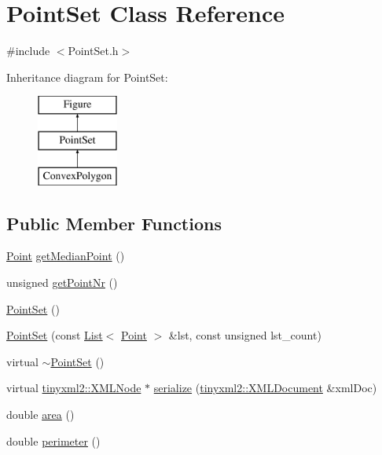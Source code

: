 \hypertarget{class_point_set}{}\section{Point\+Set Class Reference}
\label{class_point_set}


{\ttfamily \#include $<$Point\+Set.\+h$>$}

Inheritance diagram for Point\+Set\+:\begin{figure}[H]
\begin{center}
\leavevmode
\includegraphics[height=3.000000cm]{class_point_set}
\end{center}
\end{figure}
\subsection*{Public Member Functions}
\begin{DoxyCompactItemize}
\item 
\hyperlink{class_point}{Point} \hyperlink{class_point_set_a61e0b486a1834af1158fecabaec4b4cb}{get\+Median\+Point} ()
\item 
unsigned \hyperlink{class_point_set_aa67d735f70d81ba36015d059573799c6}{get\+Point\+Nr} ()
\item 
\hyperlink{class_point_set_a0795eb5d1a45f7a5f3bc643f3866eb9f}{Point\+Set} ()
\item 
\hyperlink{class_point_set_ab50e8620e72c110c28bcdb9de78fcba2}{Point\+Set} (const \hyperlink{class_list}{List}$<$ \hyperlink{class_point}{Point} $>$ \&lst, const unsigned lst\+\_\+count)
\item 
virtual \hyperlink{class_point_set_a2ac2dc1fc77866357c8e1f1818019f61}{$\sim$\+Point\+Set} ()
\item 
virtual \hyperlink{classtinyxml2_1_1_x_m_l_node}{tinyxml2\+::\+X\+M\+L\+Node} $\ast$ \hyperlink{class_point_set_a282360046d7566f50d1ceec49aca0d89}{serialize} (\hyperlink{classtinyxml2_1_1_x_m_l_document}{tinyxml2\+::\+X\+M\+L\+Document} \&xml\+Doc)
\item 
double \hyperlink{class_point_set_aca8092b860a40743fb1c1189e8439764}{area} ()
\item 
double \hyperlink{class_point_set_a82b83d662bd5570e6e049e120e1c6bac}{perimeter} ()
\end{DoxyCompactItemize}
